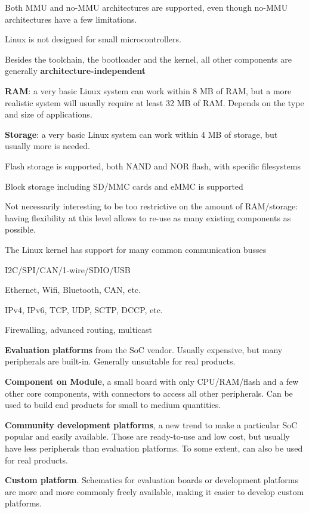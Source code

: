 \startitemize
\item Both MMU and no-MMU architectures are supported, even though
  no-MMU architectures have a few limitations.
\item Linux is not designed for small microcontrollers.
\item Besides the toolchain, the bootloader and the kernel, all
  other components are generally {\bf architecture-independent}
\stopitemize



\startitemize
\item {\bf RAM}: a very basic Linux system can work within 8 MB of
  RAM, but a more realistic system will usually require at least 32
  MB of RAM. Depends on the type and size of applications.
\item {\bf Storage}: a very basic Linux system can work within 4 MB
  of storage, but usually more is needed.
  \startitemize
  \item Flash storage is supported, both NAND and NOR flash, with
    specific filesystems
  \item Block storage including SD/MMC cards and eMMC is supported
  \stopitemize
\item Not necessarily interesting to be too restrictive on the
  amount of RAM/storage: having flexibility at this level allows to
  re-use as many existing components as possible.
\stopitemize



The Linux kernel has support for many common communication
  busses
  \startitemize
  \item I2C/SPI/CAN/1-wire/SDIO/USB
  \item Ethernet, Wifi, Bluetooth, CAN, etc.
  \item IPv4, IPv6, TCP, UDP, SCTP, DCCP, etc.
  \item Firewalling, advanced routing, multicast
  \stopitemize

\startitemize
\item {\bf Evaluation platforms} from the SoC vendor. Usually
  expensive, but many peripherals are built-in. Generally unsuitable
  for real products.
\item {\bf Component on Module}, a small board with only
  CPU/RAM/flash and a few other core components, with connectors to
  access all other peripherals. Can be used to build end products
  for small to medium quantities.
\item {\bf Community development platforms}, a new trend to make a
  particular SoC popular and easily available. Those are
  ready-to-use and low cost, but usually have less peripherals than
  evaluation platforms. To some extent, can also be used for real
  products.
\item {\bf Custom platform}. Schematics for evaluation boards or
  development platforms are more and more commonly freely available,
  making it easier to develop custom platforms.
\stopitemize



